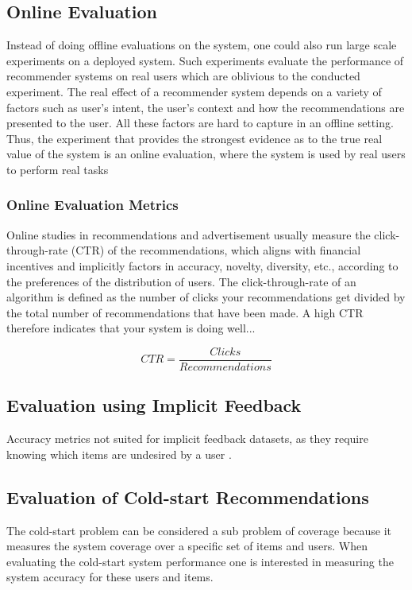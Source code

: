 \subsection{Online Evaluation}

Instead of doing offline evaluations on the system, one could also run large
scale experiments on a deployed system. Such experiments evaluate the
performance of recommender systems on real users which are oblivious to the
conducted experiment. The real effect of a recommender system depends on a
variety of factors such as user’s intent, the user’s context and how the
recommendations are presented to the user. All these factors are hard to
capture in an offline setting. Thus, the experiment that provides the strongest evidence as to the true real value of the system is an online evaluation, where the system is used by real users to perform real tasks

\subsubsection{Online Evaluation Metrics}

Online studies in recommendations and advertisement usually measure the click-through-rate (CTR) of the recommendations,
which aligns with financial incentives and implicitly factors in accuracy,
novelty, diversity, etc., according to the preferences of the distribution of users.
The click-through-rate of an algorithm is defined as the number of clicks your
recommendations get divided by the total number of recommendations that
have been made. A high CTR therefore indicates that your system is doing
well...

\begin{equation}
CTR = \frac{Clicks}{Recommendations}
\end{equation}

\subsection{Evaluation using Implicit Feedback}

Accuracy metrics not suited for implicit feedback datasets, as they require
knowing which items are undesired by a user \cite{Hu2008}.

\subsection{Evaluation of Cold-start Recommendations}

The cold-start problem can be considered a sub problem of coverage because it measures the system coverage over a specific set of items and users. When evaluating the cold-start system performance one is interested in measuring the system accuracy for these users and items.


